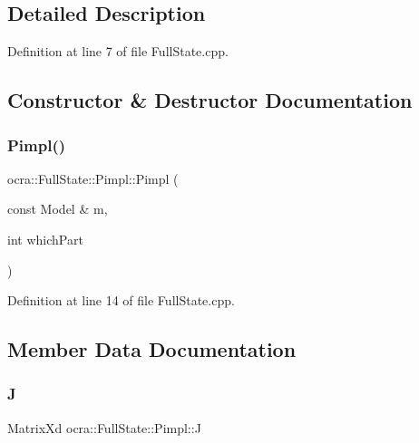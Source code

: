\subsection{Detailed Description}


Definition at line 7 of file Full\+State.\+cpp.



\subsection{Constructor \& Destructor Documentation}
\hypertarget{structocra_1_1FullState_1_1Pimpl_a0bede192675a41ae72485eacefca15ac}{}\label{structocra_1_1FullState_1_1Pimpl_a0bede192675a41ae72485eacefca15ac} 
\subsubsection{\texorpdfstring{Pimpl()}{Pimpl()}}
{\footnotesize\ttfamily ocra\+::\+Full\+State\+::\+Pimpl\+::\+Pimpl (\begin{DoxyParamCaption}\item[{const Model \&}]{m,  }\item[{int}]{which\+Part }\end{DoxyParamCaption})\hspace{0.3cm}{\ttfamily [inline]}}



Definition at line 14 of file Full\+State.\+cpp.



\subsection{Member Data Documentation}
\hypertarget{structocra_1_1FullState_1_1Pimpl_a150f47fa013614729e1e6aedf141523f}{}\label{structocra_1_1FullState_1_1Pimpl_a150f47fa013614729e1e6aedf141523f} 
\subsubsection{\texorpdfstring{J}{J}}
{\footnotesize\ttfamily Matrix\+Xd ocra\+::\+Full\+State\+::\+Pimpl\+::J}



